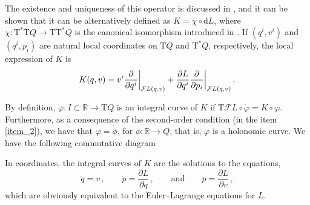 \documentclass[11pt]{article}
\theoremstyle{plain}
\theoremstyle{definition}
\newcommand\restr[2]{{%
  \left.\kern-\nulldelimiterspace %
  #1 %
  \right|_{#2} %
}}
\newcommand{\R}{\mathbb{R}}
\renewcommand{\d}{\mathrm{d}}
\newcommand{\T}{{\mathrm T}}
\let\Tan\T
\newcommand{\cT}{\T^{\ast}}
\newcommand{\F}{\mathcal{F}}
\newcommand{\parder}[2]{\frac{\partial #1}{\partial #2}}
\def\d{\mathrm{d}}
\def\d{\mathrm{d}}
\def\Tan{\mathrm{T}}
\begin{document}
The existence and uniqueness of this operator is discussed in \cite{GP_89}, 
and it can be shown that it 
can be alternatively defined as 
$K=\chi\circ\d L$, 
where 
$\chi \colon \Tan^*\Tan Q\to \Tan\Tan^*Q$ 
is the canonical isomorphism introduced in 
\cite{Tul_1976b}.
If $(q^i,v^i)$ and $(q^i,p_i)$ are natural local coordinates on $\Tan Q$ and $\Tan^*Q$, respectively,
the local expression of $K$ is
\begin{equation}\label{K.coordinates}
    K(q,v) = v^i\restr{\parder{}{q^i}}{\F L(q,v)}+ \parder{L}{q^i}
    \restr{\parder{}{p_i}}{\F L(q,v)}\,.
\end{equation}

By definition, $\varphi: I\subset\R \to \T Q$ is an integral curve of $K$ if $\T\F L \circ \dot\varphi = K \circ \varphi$. Furthermore, as a consequence of the second-order condition (in the item \ref{item_2}), we have that $\varphi=\dot\phi$, for $\phi: \R \to Q$, that is, $\varphi$ is a holonomic curve. We have the following commutative diagram

\begin{center}
\end{center}

\noindent In coordinates, the integral curves of $K$ are the solutions to the equations, 
\begin{equation}
\dot{q} = v\,,\qquad \dot{p} = \parder{L}{q}\,,\qquad \text{and} \qquad p = \parder{L}{v}\,,
\label{K.integral.curves}
\end{equation}
which are obviously equivalent to the Euler--Lagrange equations for $L$.
\end{document}
